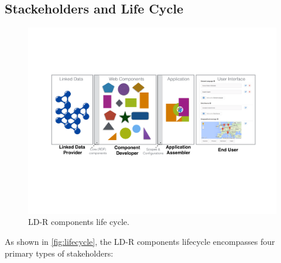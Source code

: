 \documentclass{llncs}
\begin{document}
\subsection{Stackeholders and Life Cycle}
\begin{figure}[tb]
  \includegraphics[width=1\linewidth]{images/lifecycle.pdf}
  \caption{LD-R components life cycle.}
  \label{fig:lifecycle}
\end{figure}

As shown in \autoref{fig:lifecycle}, the LD-R components lifecycle encompasses four primary types of stakeholders:
\end{document}
